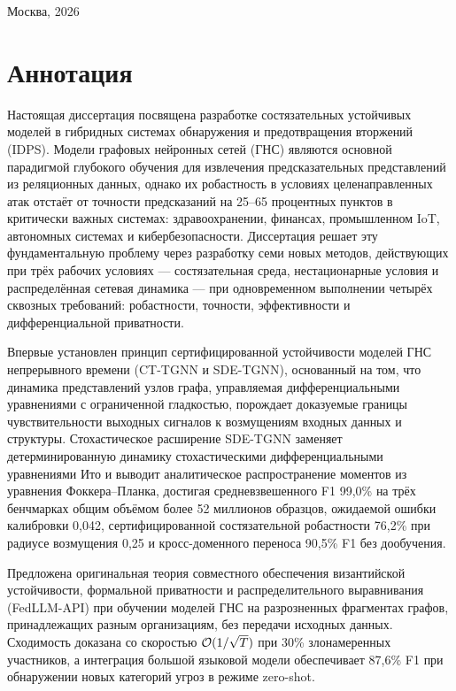 \begin{titlepage}
\begin{center}
\vfill

{\small Москва, 2026}
\end{center}
\end{titlepage}


\chapter*{Аннотация}

Настоящая диссертация посвящена разработке состязательных устойчивых моделей в гибридных системах обнаружения и предотвращения вторжений (IDPS). Модели графовых нейронных сетей (ГНС) являются основной парадигмой глубокого обучения для извлечения предсказательных представлений из реляционных данных, однако их робастность в условиях целенаправленных атак отстаёт от точности предсказаний на 25--65 процентных пунктов в критически важных системах: здравоохранении, финансах, промышленном IoT, автономных системах и кибербезопасности. Диссертация решает эту фундаментальную проблему через разработку семи новых методов, действующих при трёх рабочих условиях --- состязательная среда, нестационарные условия и распределённая сетевая динамика --- при одновременном выполнении четырёх сквозных требований: робастности, точности, эффективности и дифференциальной приватности.

Впервые установлен принцип сертифицированной устойчивости моделей ГНС непрерывного времени (CT-TGNN и SDE-TGNN), основанный на том, что динамика представлений узлов графа, управляемая дифференциальными уравнениями с ограниченной гладкостью, порождает доказуемые границы чувствительности выходных сигналов к возмущениям входных данных и структуры. Стохастическое расширение SDE-TGNN заменяет детерминированную динамику стохастическими дифференциальными уравнениями Ито и выводит аналитическое распространение моментов из уравнения Фоккера--Планка, достигая средневзвешенного F1 99,0\% на трёх бенчмарках общим объёмом более 52 миллионов образцов, ожидаемой ошибки калибровки 0,042, сертифицированной состязательной робастности 76,2\% при радиусе возмущения 0,25 и кросс-доменного переноса 90,5\% F1 без дообучения.

Предложена оригинальная теория совместного обеспечения византийской устойчивости, формальной приватности и распределительного выравнивания (FedLLM-API) при обучении моделей ГНС на разрозненных фрагментах графов, принадлежащих разным организациям, без передачи исходных данных. Сходимость доказана со скоростью $\mathcal{O}(1/\sqrt{T})$ при 30\% злонамеренных участников, а интеграция большой языковой модели обеспечивает 87,6\% F1 при обнаружении новых категорий угроз в режиме zero-shot.

